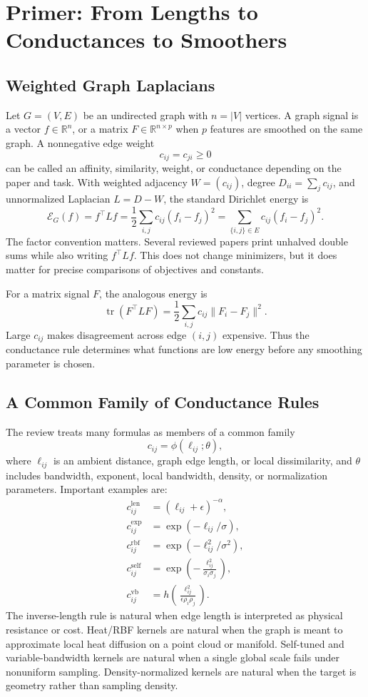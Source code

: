 \documentclass[11pt]{article}
\newcommand{\R}{\mathbb{R}}
\newcommand{\E}{\mathcal{E}}
\newcommand{\tr}{\operatorname{tr}}
\begin{document}
\section{Primer: From Lengths to Conductances to Smoothers}

\subsection{Weighted Graph Laplacians}

Let \(G=(V,E)\) be an undirected graph with \(n=|V|\) vertices.  A graph signal
is a vector \(f\in\R^n\), or a matrix \(F\in\R^{n\times p}\) when \(p\)
features are smoothed on the same graph.  A nonnegative edge weight
\[
  c_{ij}=c_{ji}\ge 0
\]
can be called an affinity, similarity, weight, or conductance depending on the
paper and task.  With weighted adjacency \(W=(c_{ij})\), degree
\(D_{ii}=\sum_j c_{ij}\), and unnormalized Laplacian \(L=D-W\), the standard
Dirichlet energy is
\[
  \E_G(f)
  =
  f^\top L f
  =
  \frac12\sum_{i,j} c_{ij}(f_i-f_j)^2
  =
  \sum_{\{i,j\}\in E} c_{ij}(f_i-f_j)^2.
\]
The factor convention matters.  Several reviewed papers print unhalved double
sums while also writing \(f^\top Lf\).  This does not change minimizers, but it
does matter for precise comparisons of objectives and constants.

For a matrix signal \(F\), the analogous energy is
\[
  \tr(F^\top L F)
  =
  \frac12\sum_{i,j} c_{ij}\|F_i-F_j\|^2.
\]
Large \(c_{ij}\) makes disagreement across edge \((i,j)\) expensive.  Thus the
conductance rule determines what functions are low energy before any smoothing
parameter is chosen.

\subsection{A Common Family of Conductance Rules}

The review treats many formulas as members of a common family
\[
  c_{ij}=\phi(\ell_{ij};\theta),
\]
where \(\ell_{ij}\) is an ambient distance, graph edge length, or local
dissimilarity, and \(\theta\) includes bandwidth, exponent, local bandwidth,
density, or normalization parameters.  Important examples are:
\begin{align}
  c_{ij}^{\mathrm{len}} &= (\ell_{ij}+\epsilon)^{-\alpha},\\
  c_{ij}^{\mathrm{exp}} &= \exp(-\ell_{ij}/\sigma),\\
  c_{ij}^{\mathrm{rbf}} &= \exp(-\ell_{ij}^2/\sigma^2),\\
  c_{ij}^{\mathrm{self}} &= \exp\!\left(-\frac{\ell_{ij}^2}{\sigma_i\sigma_j}\right),\\
  c_{ij}^{\mathrm{vb}} &=
    h\!\left(\frac{\ell_{ij}^2}{\epsilon \rho_i\rho_j}\right).
\end{align}
The inverse-length rule is natural when edge length is interpreted as physical
resistance or cost.  Heat/RBF kernels are natural when the graph is meant to
approximate local heat diffusion on a point cloud or manifold.  Self-tuned and
variable-bandwidth kernels are natural when a single global scale fails under
nonuniform sampling.  Density-normalized kernels are natural when the target is
geometry rather than sampling density.
\end{document}
